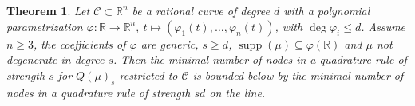 \documentclass[11pt,a4paper]{amsart}
\numberwithin{equation}{section}
\newtheorem{thm}{Theorem}
\newtheorem{lemma}[thm]{Lemma}
\theoremstyle{definition}
\newcommand{\R}{\mathbb{R}}
\newcommand{\K}{\mathbb{K}}
\numberwithin{thm}{section}
\theoremstyle{break}
\numberwithin{subcase}{case}
\begin{document}

\begin{thm}\label{thm:curve-to-line}
Let $\mathcal C\subset \R^n$ be a rational curve of degree $d$ with a polynomial parametrization
$\varphi:\R\to \R^n,\ t\mapsto (\varphi_1(t),\dots,\varphi_n(t))$, with $\deg \varphi_i\le d$.
Assume $n\ge 3$, the coefficients of $\varphi$ are generic, $s\ge d$, $\operatorname{supp}(\mu)\subseteq \varphi(\R)$ and $\mu$ not degenerate in degree $s$.
Then the minimal number of nodes in a quadrature rule of strength $s$ for $Q(\mu)_s$ restricted to $\mathcal C$
is bounded below by the minimal number of nodes in a quadrature rule of strength $sd$ on the line.
\end{thm}
\end{document}
